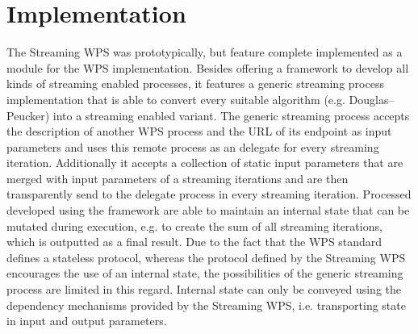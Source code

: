   \section{Implementation}
    The Streaming WPS was prototypically, but feature complete implemented as a module for the \ftn WPS implementation. Besides offering a framework to develop all kinds of streaming enabled processes, it features a generic streaming process implementation that is able to convert every suitable algorithm (e.g. Douglas–Peucker) into a streaming enabled variant. The generic streaming process accepts the description of another WPS process and the URL of its endpoint as input parameters and uses this remote process as an delegate for every streaming iteration. Additionally it accepts a collection of static input parameters that are merged with input parameters of a streaming iterations and are then transparently send to the delegate process in every streaming iteration. Processed developed using the framework are able to maintain an internal state that can be mutated during execution, e.g. to create the sum of all streaming iterations, which is outputted as a final result. Due to the fact that the WPS standard defines a stateless protocol, whereas the protocol defined by the Streaming WPS encourages the use of an internal state, the possibilities of the generic streaming process are limited in this regard. Internal state can only be conveyed using the dependency mechanisms provided by the Streaming WPS, i.e. transporting state in input and output parameters.


